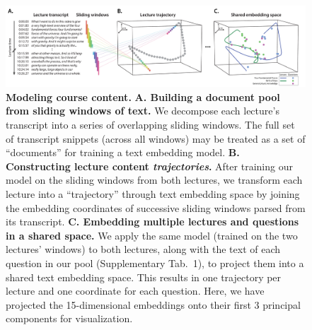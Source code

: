 \documentclass[10pt]{article}
\newcommand{\questions}{1}
\begin{document}
\begin{figure}[tp]
    \centering
    \includegraphics[width=\textwidth]{figs/sliding_windows}

    \caption{\textbf{Modeling course content.} \textbf{A. Building a document pool
    from sliding windows of text.} We decompose each lecture's transcript into a
    series of overlapping sliding windows. The full set of transcript snippets (across
    all windows) may be treated as a set of ``documents'' for training a text
    embedding model. \textbf{B. Constructing lecture content
    \textit{trajectories}.} After training our model on the sliding windows from
    both lectures, we transform each lecture into a ``trajectory'' through text
    embedding space by joining the embedding coordinates of successive sliding
    windows parsed from its transcript. \textbf{C. Embedding multiple lectures and
    questions in a shared space.} We apply the same model (trained on the two
    lectures' windows) to both lectures, along with the text of each question in
    our pool (Supplementary Tab.~\questions), to project them into a shared text embedding space.
    This results in one trajectory per lecture and one coordinate for each
    question. Here, we have projected the 15-dimensional embeddings onto their first
    3 principal components for visualization.}

    \label{fig:sliding-windows}
\end{figure}
\end{document}
